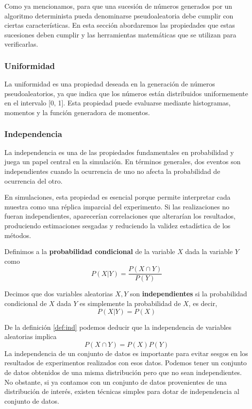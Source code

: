 \documentclass[../Main.tex]{subfiles}
\begin{document}
Como ya mencionamos, para que una sucesión de números generados por un algoritmo determinista pueda denominarse pseudoaleatoria debe cumplir con ciertas características. En esta sección abordaremos las propiedades que estas sucesiones deben cumplir y las herramientas matemáticas que se utilizan para verificarlas. 
\subsubsection{Uniformidad}
La uniformidad es una propiedad deseada en la generación de números pseudoaleatorios, ya que indica que los números están distribuidos uniformemente en el intervalo [0, 1]. Esta propiedad puede evaluarse mediante histogramas, momentos y la función generadora de momentos.

\subsubsection{Independencia}

La independencia es una de las propiedades fundamentales en probabilidad y juega un papel central en la simulación. En términos generales, dos eventos son independientes cuando la ocurrencia de uno no afecta la probabilidad de ocurrencia del otro.  

En simulaciones, esta propiedad es esencial porque permite interpretar cada muestra como una réplica imparcial del experimento. Si las realizaciones no fueran independientes, aparecerían correlaciones que alterarían los resultados, produciendo estimaciones sesgadas y reduciendo la validez estadística de los métodos.  

\begin{definition}
    Definimos a la \textbf{probabilidad condicional} de la variable $X$ dada la variable $Y$ como \[P(X|Y)=\frac{P(X\cap Y)}{P(Y)}\]
\end{definition}
\begin{definition}
\label{def:ind}
    Decimos que dos variables aleatorias $X,Y$ son \textbf{independientes} si la probabilidad condicional de $X$ dada $Y$ es simplemente la probabilidad de $X$, es decir, \[P(X|Y)=P(X)\]
\end{definition}

De la definición \ref{def:ind} podemos deducir que la independencia de variables aleatorias implica \[P(X\cap Y)=P(X)P(Y)\]
La independencia de un conjunto de datos es importante para evitar sesgos en los resultados de experimentos realizados con esos datos. Podemos tener un conjunto de datos obtenidos de una misma distribución pero que no sean independientes. No obstante, si ya contamos con un conjunto de datos provenientes de una distribución de interés, existen técnicas simples para dotar de independencia al conjunto de datos. 
\end{document}
